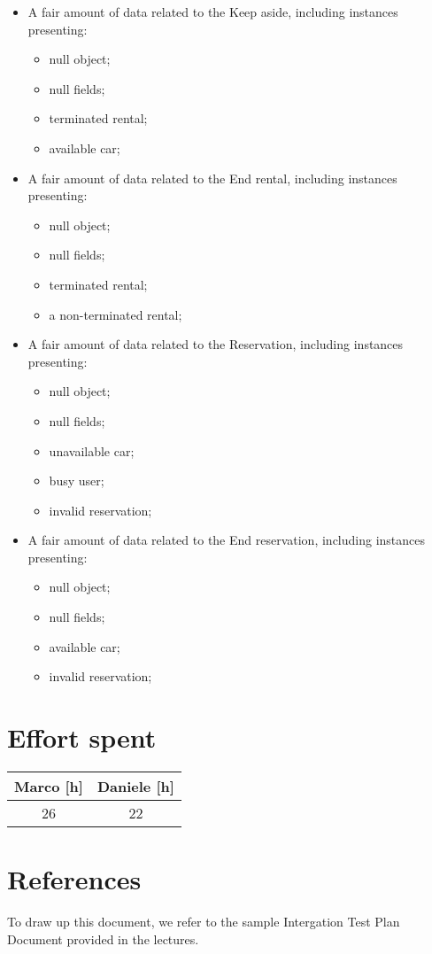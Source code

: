 \documentclass{scrreprt}
\begin{document}
\begin{itemize}
\item A fair amount of data related to the Keep aside, including instances presenting:
\begin{itemize}
	\item null object;
	\item null fields;
	\item terminated rental;
	\item available car;
	\end{itemize}

\item A fair amount of data related to the End rental, including instances presenting:
\begin{itemize}
	\item null object;
	\item null fields;
	\item terminated rental;
	\item a non-terminated rental;
	\end{itemize}

\item A fair amount of data related to the Reservation, including instances presenting:
\begin{itemize}
	\item null object;
	\item null fields;
	\item unavailable car;
	\item busy user;
	\item invalid reservation;
	\end{itemize}

\item A fair amount of data related to the End reservation, including instances presenting:
\begin{itemize}
	\item null object;
	\item null fields;
	\item available car;
	\item invalid reservation;
	\end{itemize}
\end{itemize}

\chapter{Effort spent}

\begin{center}
    \begin{tabular}{cc}
        \toprule
	   \textbf{ Marco [h]  }& \textbf{ Daniele [h] }\\
	   \midrule
        26&22\\
	\bottomrule
    \end{tabular}
\end{center}
\chapter{References}
To draw up this document, we refer to the sample Intergation Test Plan Document provided in the lectures.
\end{document}
